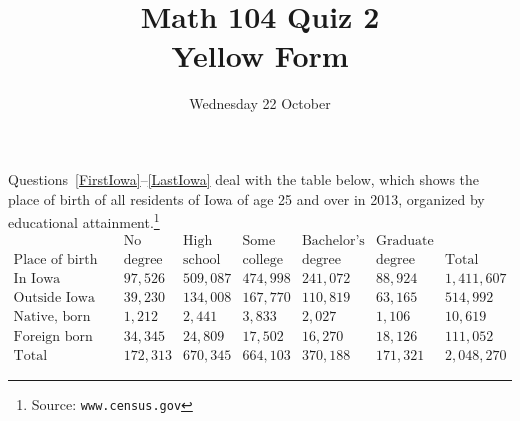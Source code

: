 \documentclass[answers,12pt]{exam}
\title{Math 104 Quiz 2\\Yellow Form}
\date{Wednesday 22 October}
\begin{document}
\maketitle
\begin{center}
\end{center}

Questions~\ref{FirstIowa}--\ref{LastIowa} deal with
the table below, which shows the place of birth of 
all residents of Iowa of age 25 and over
in 2013, organized by educational
attainment.\footnote{Source: \tt www.census.gov}
\[\begin{array}{r|rrrrr|r}
&\text{No}&\text{High}&\text{Some}&\text{Bachelor's}&\text{Graduate}\\
\text{Place of birth}&\text{degree}
&\text{school}&\text{college}&\text{degree}&\text{degree}&\text{Total}
\\\hline
\text{In Iowa}
&97,526&509,087&474,998&241,072&88,924&1,411,607\\
\text{Outside Iowa}
&39,230&134,008&167,770&110,819&63,165&514,992\\
\text{Native, born outside US}
&1,212&2,441&3,833&2,027&1,106&10,619\\
\text{Foreign born}
&34,345&24,809&17,502&16,270&18,126&111,052\\\hline
\text{Total}
&172,313&670,345&664,103&370,188&171,321&2,048,270
\end{array}\]
\end{document}
